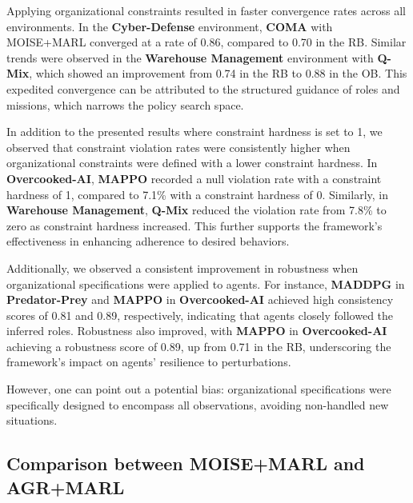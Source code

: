 \documentclass[sigconf]{aamas}
\begin{document}
Applying organizational constraints resulted in faster convergence rates across all environments. In the \textbf{Cyber-Defense} environment, \textbf{COMA} with MOISE+MARL converged at a rate of 0.86, compared to 0.70 in the RB. Similar trends were observed in the \textbf{Warehouse Management} environment with \textbf{Q-Mix}, which showed an improvement from 0.74 in the RB to 0.88 in the OB. This expedited convergence can be attributed to the structured guidance of roles and missions, which narrows the policy search space.

In addition to the presented results where constraint hardness is set to 1, we observed that constraint violation rates were consistently higher when organizational constraints were defined with a lower constraint hardness. In \textbf{Overcooked-AI}, \textbf{MAPPO} recorded a null violation rate with a constraint hardness of 1, compared to 7.1\% with a constraint hardness of 0. Similarly, in \textbf{Warehouse Management}, \textbf{Q-Mix} reduced the violation rate from 7.8\% to zero as constraint hardness increased. This further supports the framework's effectiveness in enhancing adherence to desired behaviors.

Additionally, we observed a consistent improvement in robustness when organizational specifications were applied to agents. For instance, \textbf{MADDPG} in \textbf{Predator-Prey} and \textbf{MAPPO} in \textbf{Overcooked-AI} achieved high consistency scores of 0.81 and 0.89, respectively, indicating that agents closely followed the inferred roles. Robustness also improved, with \textbf{MAPPO} in \textbf{Overcooked-AI} achieving a robustness score of 0.89, up from 0.71 in the RB, underscoring the framework's impact on agents' resilience to perturbations.

However, one can point out a potential bias: organizational specifications were specifically designed to encompass all observations, avoiding non-handled new situations.


\subsection{Comparison between MOISE+MARL and AGR+MARL}
\end{document}
